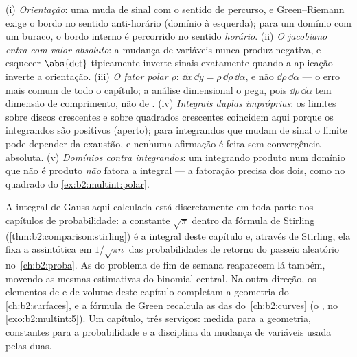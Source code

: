 \begin{remark}
(i) \emph{Orientação}: uma  muda de sinal com o
sentido de percurso, e Green--Riemann exige o bordo
no sentido anti-horário (domínio à esquerda); para um domínio com um
buraco, o bordo interno é percorrido no sentido \emph{horário}. (ii)
\emph{O jacobiano entra com valor absoluto}: a mudança de
variáveis nunca produz  negativa, e esquecer
$\abs{\det}$ tipicamente inverte sinais exatamente quando a aplicação
inverte a orientação. (iii) \emph{O fator polar $\rho$}:
$\dd x\,\dd y = \rho\,\dd\rho\,\dd\alpha$, e não
$\dd\rho\,\dd\alpha$ --- o erro mais comum de todo o
capítulo; a análise dimensional o pega, pois
$\dd\rho\,\dd\alpha$ tem dimensão de comprimento, não de
. (iv) \emph{Integrais duplas impróprias}: os limites sobre
discos crescentes e sobre quadrados crescentes coincidem aqui porque os
integrandos são positivos (aperto); para integrandos que mudam de
sinal o limite pode depender da exaustão, e nenhuma
afirmação é feita sem convergência absoluta. (v)
\emph{Domínios contra integrandos}: um integrando produto num
domínio que não é produto \emph{não} fatora a integral ---
a fatoração precisa dos dois, como no quadrado do
\cref{ex:b2:multint:polar}.
\end{remark}

\begin{remark}
A integral de Gauss aqui calculada está discretamente em toda parte nos
capítulos de probabilidade: a constante $\sqrt\pi$ dentro da
fórmula de Stirling (\cref{thm:b2:comparison:stirling}) é
a integral deste capítulo e, através de Stirling, ela fixa a
assintótica em $1/\sqrt{\pi n}$ das probabilidades de retorno do
passeio aleatório no~\cref{ch:b2:proba}. As  do
problema de fim de semana reaparecem lá também, movendo as mesmas
estimativas do binomial central. Na outra direção, os elementos de
 e de volume deste capítulo completam a geometria do
\cref{ch:b2:surfaces}, e a fórmula de Green recalcula as  das
 do~\cref{ch:b2:curves} (o , no
\cref{exo:b2:multint:5}). Um capítulo, três serviços:
medida para a geometria, constantes para a probabilidade e a
disciplina da mudança de variáveis usada pelas duas.
\end{remark}

